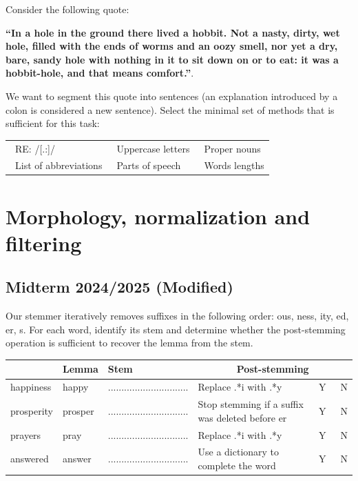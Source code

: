 \documentclass{../extra/aakpract/aakpract}
\begin{document}
	Consider the following quote:
	
	\textbf{``In a hole in the ground there lived a hobbit. Not a nasty, dirty, wet hole, filled
		with the ends of worms and an oozy smell, nor yet a dry, bare, sandy hole with nothing in it to sit down
		on or to eat: it was a hobbit-hole, and that means comfort.''}.
	
	We want to segment this quote into sentences (an explanation introduced by a colon is considered a new sentence). 
	Select the minimal set of methods that is sufficient for this task:
	\begin{center}
		\begin{tabular}{|lll|}
			\hline
			\Square\ RE: /[.:]/ & 
			\Square\ Uppercase letters & 
			\Square\ Proper nouns \\
			\Square\ List of abbreviations &
			\Square\ Parts of speech &
			\Square\ Words lengths\\
			\hline
		\end{tabular}
	\end{center}
	
	
	\section{Morphology, normalization and filtering}
	
	\subsection{Midterm 2024/2025 (Modified)}
	
	Our stemmer iteratively removes suffixes in the following order: ous, ness, ity, ed, er, s. 
	For each word, identify its stem and determine whether the post-stemming operation is sufficient to recover the lemma from the stem.
	\begin{center}
		\begin{tabular}{|l|l|l|l|l|}
			\hline
			& Lemma & Stem & \multicolumn{2}{|c|}{Post-stemming}\\
			\hline
			happiness & happy & .............................. & Replace .*i with .*y  & \Circle\ Y\ \ \Circle\ N\\
			\hline
			prosperity & prosper & .............................. & Stop stemming if a suffix was deleted before er  & \Circle\ Y\ \ \Circle\ N\\
			\hline
			prayers & pray & .............................. & Replace .*i with .*y   & \Circle\ Y\ \ \Circle\ N\\
			\hline
			answered & answer & .............................. & Use a dictionary to complete the word  & \Circle\ Y\ \ \Circle\ N\\
			\hline
		\end{tabular}
	\end{center}
	
\end{document}
